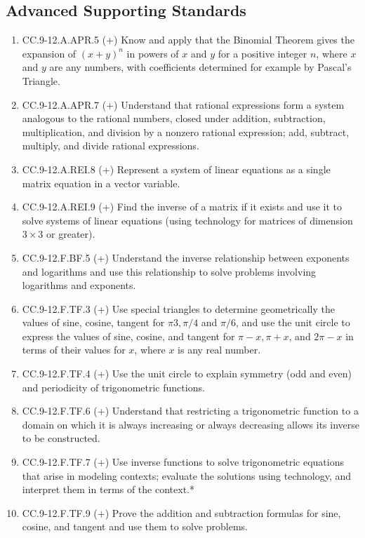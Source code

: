 \subsection*{Advanced Supporting Standards}
\begin{enumerate}
	\item CC.9-12.A.APR.5 (+) Know and apply that the Binomial Theorem gives the expansion of $(x + y)^n$ in powers of $x$ and $y$ for a positive integer $n$, where $x$ and $y$ are any numbers, with coefficients determined for example by Pascal’s Triangle. 
	\item CC.9-12.A.APR.7 (+)  Understand that rational expressions form a system analogous to the rational numbers, closed under addition, subtraction, multiplication, and division by a nonzero rational expression; add, subtract, multiply, and divide rational expressions.
	\item CC.9-12.A.REI.8 (+)  Represent a system of linear equations as a single matrix equation in a vector variable.
	\item CC.9-12.A.REI.9 (+)  Find the inverse of a matrix if it exists and use it to solve systems of linear equations (using technology for matrices of dimension $3 \times 3$ or greater).
	\item CC.9-12.F.BF.5 (+) Understand the inverse relationship between exponents and logarithms and use this relationship to solve problems involving logarithms and exponents.
	\item CC.9-12.F.TF.3 (+)  Use special triangles to determine geometrically the values of sine, cosine, tangent for $\pi3, \pi/4$ and $\pi/6$, and use the unit circle to express the values of sine, cosine, and tangent for $\pi - x, \pi + x$, and $2\pi - x$ in terms of their values for $x$, where $x$ is any real number.
	\item CC.9-12.F.TF.4 (+)  Use the unit circle to explain symmetry (odd and even) and periodicity of trigonometric functions.
	\item CC.9-12.F.TF.6 (+)  Understand that restricting a trigonometric function to a domain on which it is always increasing or always decreasing allows its inverse to be constructed.
	\item CC.9-12.F.TF.7 (+) Use inverse functions to solve trigonometric equations that arise in modeling contexts; evaluate the solutions using technology, and interpret them in terms of the context.*
	\item CC.9-12.F.TF.9 (+)  Prove the addition and subtraction formulas for sine, cosine, and tangent and use them to solve problems.

\end{enumerate}

